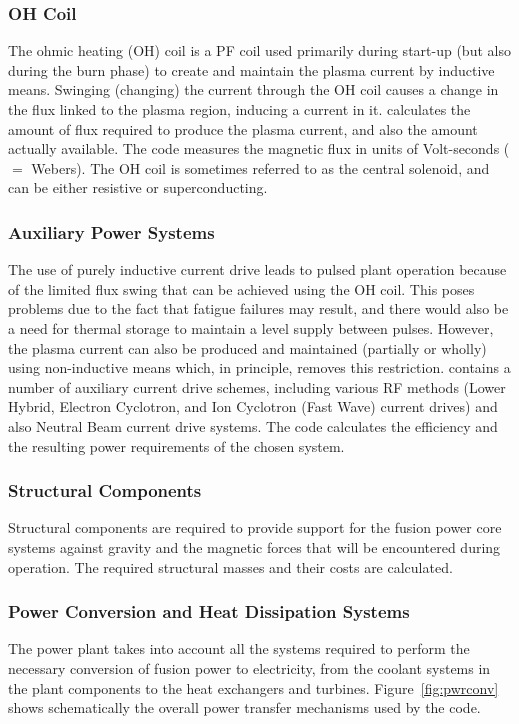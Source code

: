 \subsubsection{OH Coil}
The ohmic heating (OH) coil is a PF coil used primarily during start-up (but
also during the burn phase) to create and maintain the plasma current by
inductive means. Swinging (changing) the current through the OH coil causes a
change in the flux linked to the plasma region, inducing a current in it. \PS
calculates the amount of flux required to produce the plasma current, and also
the amount actually available. The code measures the magnetic flux in units of
Volt-seconds ($=$ Webers). The OH coil is sometimes referred to as the central
solenoid, and can be either resistive or superconducting.

\subsubsection{Auxiliary Power Systems}
The use of purely inductive current drive leads to pulsed plant operation
because of the limited flux swing that can be achieved using the OH coil. This
poses problems due to the fact that fatigue failures may result, and there
would also be a need for thermal storage to maintain a level supply between
pulses. However, the plasma current can also be produced and maintained
(partially or wholly) using non-inductive means which, in principle, removes
this restriction. \PS contains a number of auxiliary current drive schemes,
including various RF methods (Lower Hybrid, Electron Cyclotron, and Ion
Cyclotron (Fast Wave) current drives) and also Neutral Beam current drive
systems. The code calculates the efficiency and the resulting power
requirements of the chosen system.

\subsubsection{Structural Components}
Structural components are required to provide support for the fusion power
core systems against gravity and the magnetic forces that will be encountered
during operation. The required structural masses and their costs are
calculated.

\subsubsection{Power Conversion and Heat Dissipation Systems}
The \PS power plant takes into account all the systems required to perform the
necessary conversion of fusion power to electricity, from the coolant systems
in the plant components to the heat exchangers and turbines.
Figure~\ref{fig:pwrconv} shows schematically the overall power transfer
mechanisms used by the code.

